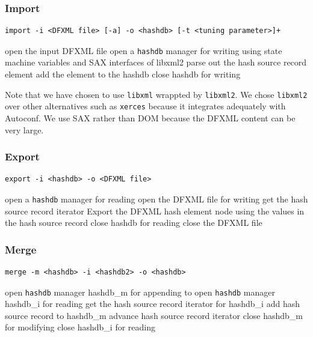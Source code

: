 \documentclass[10pt,twoside]{article}
\newcommand{\hdb}{\texttt{hashdb}\xspace}
\begin{document}
\subsubsection{Import}
\begin{small}
\begin{verbatim}
import -i <DFXML file> [-a] -o <hashdb> [-t <tuning parameter>]+
\end{verbatim}
\end{small}
\begin{algorithmic}
\STATE open the input DFXML file
\STATE open a \hdb manager for writing
\STATE using state machine variables and SAX interfaces of libxml2
  \STATE parse out the hash source record element
  \STATE add the element to the hashdb
\ENDFOR
\STATE close hashdb for writing
\end{algorithmic}

Note that we have chosen to use \texttt{libxml} wrappted by \texttt{libxml2}.
We chose \texttt{libxml2} over other alternatives such as \texttt{xerces}
because it integrates adequately with Autoconf.
We use SAX rather than DOM because the DFXML content can be very large.

\subsubsection{Export}
\begin{small}
\begin{verbatim}
export -i <hashdb> -o <DFXML file>
\end{verbatim}
\end{small}
\begin{algorithmic}
\STATE open a \hdb manager for reading
\STATE open the DFXML file for writing
\STATE get the hash source record iterator
  \STATE Export the DFXML hash element node using the values in the hash source record
\ENDFOR
\STATE close hashdb for reading
\STATE close the DFXML file
\end{algorithmic}

\subsubsection{Merge}
\begin{small}
\begin{verbatim}
merge -m <hashdb> -i <hashdb2> -o <hashdb>
\end{verbatim}
\end{small}
\begin{algorithmic}
\STATE open \hdb manager hashdb\_m for appending to
\STATE open \hdb manager hashdb\_i for reading
\STATE get the hash source record iterator for hashdb\_i
  \STATE add hash source record to hashdb\_m
  \STATE advance hash source record iterator
\ENDWHILE
\STATE close hashdb\_m for modifying
\STATE close hashdb\_i for reading
\end{algorithmic}
\end{document}
